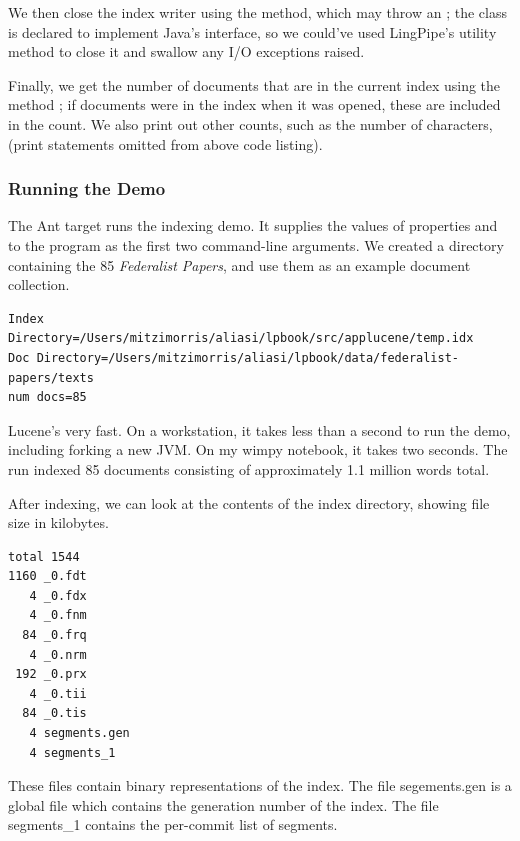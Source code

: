 We then close the index
writer using the  method, which may throw an
; the  class is declared to
implement Java's  interface, so we could've used
LingPipe's  utility method to close it
and swallow any I/O exceptions raised.

Finally, we get the number of documents that are in the current index
using the method ; if documents were in the index when
it was opened, these are included in the count.  We also print out 
other counts, such as the number of characters, (print statements omitted
from above code listing).

\subsubsection{Running the Demo}

The Ant target  runs the indexing demo.  It
supplies the values of properties  and 
to the program as the first two command-line arguments.  We created a
directory containing the 85 {\it Federalist Papers}, and use them
as an example document collection.
%
\begin{verbatim}
Index Directory=/Users/mitzimorris/aliasi/lpbook/src/applucene/temp.idx
Doc Directory=/Users/mitzimorris/aliasi/lpbook/data/federalist-papers/texts
num docs=85
\end{verbatim}
%
Lucene's very fast.  On a workstation, it takes less than a second to
run the demo, including forking a new JVM.  On my wimpy notebook,
it takes two seconds. The run indexed 85
documents consisting of approximately 1.1 million words total.

After indexing, we can look at the contents of the index directory,
showing file size in kilobytes.
%
\begin{verbatim}
total 1544
1160 _0.fdt
   4 _0.fdx
   4 _0.fnm
  84 _0.frq
   4 _0.nrm
 192 _0.prx
   4 _0.tii
  84 _0.tis
   4 segments.gen
   4 segments_1
\end{verbatim}

%
These files contain binary representations of the index.  
The file segements.gen is a global file which contains the generation number of the index.
The file segments\_1 contains the per-commit list of segments.

